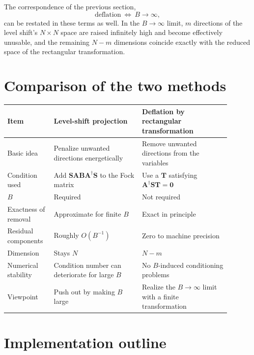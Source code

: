 \documentclass[11pt]{article}
\newcommand{\Smat}{\mathbf S}
\newcommand{\Amat}{\mathbf A}
\newcommand{\Bmat}{\mathbf B}
\newcommand{\Tmat}{\mathbf T}
\begin{document}
The correspondence of the previous section,
\[
  \text{deflation}\ \Longleftrightarrow\ B\to\infty ,
\]
can be restated in these terms as well. In the \(B\to\infty\) limit,
\(m\) directions of the level shift's \(N\times N\) space are raised
infinitely high and become effectively unusable, and the remaining
\(N-m\) dimensions coincide exactly with the reduced space of the
rectangular transformation.

\section{Comparison of the two methods}

\begin{center}
\begin{tabular}{|p{0.18\linewidth}|p{0.36\linewidth}|p{0.36\linewidth}|}
\hline
\textbf{Item} & \textbf{Level-shift projection} &
\textbf{Deflation by rectangular transformation} \\
\hline
Basic idea & Penalize unwanted directions energetically & Remove
unwanted directions from the variables \\
\hline
Condition used & Add \(\Smat\Amat\Bmat\Amat^\dagger\Smat\) to the Fock
matrix & Use a \(\Tmat\) satisfying
\(\Amat^\dagger\Smat\Tmat=\mathbf 0\) \\
\hline
\(B\) & Required & Not required \\
\hline
Exactness of removal & Approximate for finite \(B\) & Exact in
principle \\
\hline
Residual components & Roughly \(O(B^{-1})\) & Zero to machine
precision \\
\hline
Dimension & Stays \(N\) & \(N-m\) \\
\hline
Numerical stability & Condition number can deteriorate for large
\(B\) & No \(B\)-induced conditioning problems \\
\hline
Viewpoint & Push out by making \(B\) large & Realize the
\(B\to\infty\) limit with a finite transformation \\
\hline
\end{tabular}
\end{center}

\section{Implementation outline}
\end{document}
